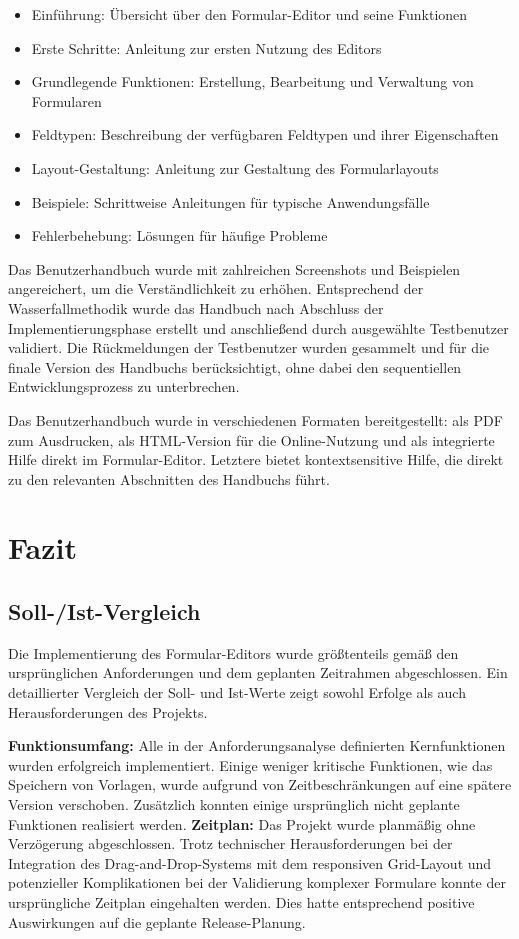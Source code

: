 \documentclass[a4paper,11pt]{article}
\begin{document}
\begin{itemize}
  \item Einführung: Übersicht über den Formular-Editor und seine Funktionen
  \item Erste Schritte: Anleitung zur ersten Nutzung des Editors
  \item Grundlegende Funktionen: Erstellung, Bearbeitung und Verwaltung von Formularen
  \item Feldtypen: Beschreibung der verfügbaren Feldtypen und ihrer Eigenschaften
  \item Layout-Gestaltung: Anleitung zur Gestaltung des Formularlayouts
  \item Beispiele: Schrittweise Anleitungen für typische Anwendungsfälle
  \item Fehlerbehebung: Lösungen für häufige Probleme
\end{itemize}

\noindent Das Benutzerhandbuch wurde mit zahlreichen Screenshots und Beispielen angereichert, um die Verständlichkeit zu erhöhen. Entsprechend der Wasserfallmethodik wurde das Handbuch nach Abschluss der Implementierungsphase erstellt und anschließend durch ausgewählte Testbenutzer validiert. Die Rückmeldungen der Testbenutzer wurden gesammelt und für die finale Version des Handbuchs berücksichtigt, ohne dabei den sequentiellen Entwicklungsprozess zu unterbrechen.

\noindent Das Benutzerhandbuch wurde in verschiedenen Formaten bereitgestellt: als PDF zum Ausdrucken, als HTML-Version für die Online-Nutzung und als integrierte Hilfe direkt im Formular-Editor. Letztere bietet kontextsensitive Hilfe, die direkt zu den relevanten Abschnitten des Handbuchs führt.

\section{Fazit}
\subsection{Soll-/Ist-Vergleich}
Die Implementierung des Formular-Editors wurde größtenteils gemäß den ursprünglichen Anforderungen und dem geplanten Zeitrahmen abgeschlossen. Ein detaillierter Vergleich der Soll- und Ist-Werte zeigt sowohl Erfolge als auch Herausforderungen des Projekts.

\noindent \textbf{Funktionsumfang:} Alle in der Anforderungsanalyse definierten Kernfunktionen wurden erfolgreich implementiert. Einige weniger kritische Funktionen, wie das Speichern von Vorlagen, wurde aufgrund von Zeitbeschränkungen auf eine spätere Version verschoben. Zusätzlich konnten einige ursprünglich nicht geplante Funktionen realisiert werden.
\noindent \textbf{Zeitplan:} Das Projekt wurde planmäßig ohne Verzögerung abgeschlossen. Trotz technischer Herausforderungen bei der Integration des Drag-and-Drop-Systems mit dem responsiven Grid-Layout und potenzieller Komplikationen bei der Validierung komplexer Formulare konnte der ursprüngliche Zeitplan eingehalten werden. Dies hatte entsprechend positive Auswirkungen auf die geplante Release-Planung.
\end{document}
